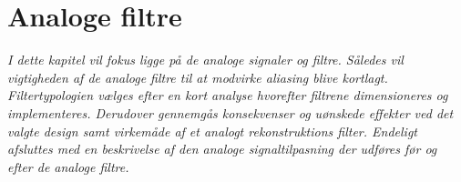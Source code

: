 \chapter{Analoge filtre}\label{kap:filtre}
\vspace*{0.5 cm}
\emph{I dette kapitel vil fokus ligge på de analoge signaler og filtre. Således vil vigtigheden af de analoge filtre til at modvirke aliasing blive kortlagt. Filtertypologien vælges efter en kort analyse hvorefter filtrene dimensioneres og implementeres. Derudover gennemgås konsekvenser og uønskede effekter ved det valgte design samt virkemåde af et analogt rekonstruktions filter. Endeligt afsluttes med en beskrivelse af den analoge signaltilpasning der udføres før og efter de analoge filtre.}
